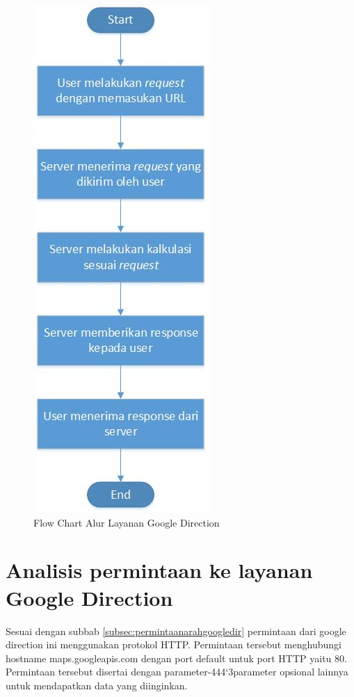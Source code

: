 			\begin{figure}[H]
				\centering		
				\includegraphics[scale=0.5]{Gambar/flowchartgoogledir.jpg}
				\caption[Flow Chart Alur Layanan Google Direction]{Flow Chart Alur Layanan Google Direction}
				\label{fig:flowchartgoogledir}	
			\end{figure}
			
\section{Analisis permintaan ke layanan Google Direction}
\label{sec:analisisrequestgoogledir}

Sesuai dengan subbab \ref{subsec:permintaanarahgoogledir} permintaan dari google direction ini menggunakan protokol HTTP. Permintaan tersebut menghubungi hostname maps.googleapis.com dengan port default untuk port HTTP yaitu 80. Permintaan tersebut disertai dengan parameter-444`3parameter opsional lainnya untuk mendapatkan data yang diinginkan.

